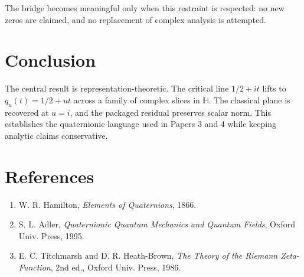 \documentclass[11pt]{article}
\begin{document}
The bridge becomes meaningful only when this restraint is respected: no new zeros are claimed, and no replacement of complex analysis is attempted.

\section{Conclusion}
The central result is representation-theoretic. The critical line $1/2+it$ lifts to $q_u(t)=1/2+ut$ across a family of complex slices in $\mathbb H$. The classical plane is recovered at $u=i$, and the packaged residual preserves scalar norm. This establishes the quaternionic language used in Papers 3 and 4 while keeping analytic claims conservative.

\section*{References}
\begin{enumerate}
\item W. R. Hamilton, \emph{Elements of Quaternions}, 1866.
\item S. L. Adler, \emph{Quaternionic Quantum Mechanics and Quantum Fields}, Oxford Univ. Press, 1995.
\item E. C. Titchmarsh and D. R. Heath-Brown, \emph{The Theory of the Riemann Zeta-Function}, 2nd ed., Oxford Univ. Press, 1986.
\end{enumerate}
\end{document}
